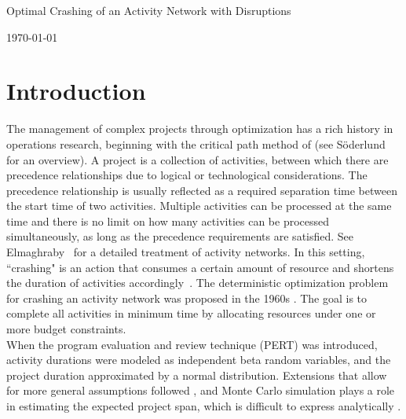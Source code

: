 \documentclass[11pt]{article}
\newcommand{\ms}{\medskip}
\begin{document}
\baselineskip0.25in

\begin{center}
\begin{large}
\begin{bf}

Optimal Crashing of an Activity Network with Disruptions \ms

\today \ms
\end{bf}
\end{large}
\end{center}

\section{Introduction} \label{sec:introduction}
	The management of complex projects through optimization has a rich history in operations research, beginning with the critical path method of \cite{kelley1961criticalpath} (see S{\"o}derlund \cite{soderlund2004building} for an overview). A project is a collection of activities, between which there are precedence relationships due to logical or technological considerations. The precedence relationship is usually reflected as a required separation time between the start time of two activities. Multiple activities can be processed at the same time and there is no limit on how many activities can be processed simultaneously, as long as the precedence requirements are satisfied. See Elmaghraby~\cite{Elmaghraby77} for a detailed treatment of activity networks. In this setting, ``crashing" is an action that consumes a certain amount of resource and shortens the duration of activities accordingly~\cite{kuhl2008dynamic}. The deterministic optimization problem for crashing an activity network was proposed in the 1960s \cite{fulkerson1961network, kelley1961criticalpath}. The goal is to complete all activities in minimum time by allocating resources under one or more budget constraints.\\
	\newline
	When the program evaluation and review technique (PERT) \cite{malcolm1959application} was introduced, activity durations were modeled as independent beta random variables, and the project duration approximated by a normal distribution. Extensions that allow for more general assumptions followed \cite{Elmaghraby77}, and Monte Carlo simulation plays a role in estimating the expected project span, which is difficult to express analytically \cite{burt1971conditional,van1963letter}.
\end{document}
